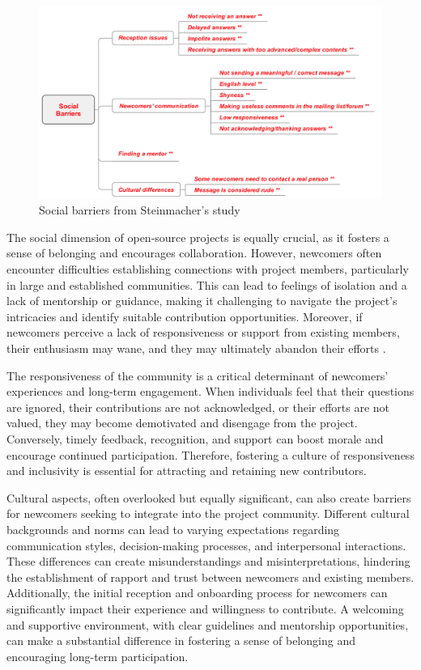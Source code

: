\begin{figure}[ht]
    \centering
    \includegraphics[width=1\linewidth]{figs/socialbarrier.png}
    \caption{Social barriers from Steinmacher's study \citep{03steinmacher2019overcoming}}
    \label{fig:socialbarrier}
\end{figure}

The social dimension of open-source projects is equally crucial, as it fosters a sense of belonging and encourages collaboration. However, newcomers often encounter difficulties establishing connections with project members, particularly in large and established communities. This can lead to feelings of isolation and a lack of mentorship or guidance, making it challenging to navigate the project's intricacies and identify suitable contribution opportunities. Moreover, if newcomers perceive a lack of responsiveness or support from existing members, their enthusiasm may wane, and they may ultimately abandon their efforts \citep{01steinmacher2015systematic,02steinmacher2015social,03steinmacher2019overcoming,04guizani2021long,14hannebauer2017relationship}.

The responsiveness of the community is a critical determinant of newcomers' experiences and long-term engagement. When individuals feel that their questions are ignored, their contributions are not acknowledged, or their efforts are not valued, they may become demotivated and disengage from the project. Conversely, timely feedback, recognition, and support can boost morale and encourage continued participation. Therefore, fostering a culture of responsiveness and inclusivity is essential for attracting and retaining new contributors.

Cultural aspects, often overlooked but equally significant, can also create barriers for newcomers seeking to integrate into the project community. Different cultural backgrounds and norms can lead to varying expectations regarding communication styles, decision-making processes, and interpersonal interactions. These differences can create misunderstandings and misinterpretations, hindering the establishment of rapport and trust between newcomers and existing members. Additionally, the initial reception and onboarding process for newcomers can significantly impact their experience and willingness to contribute. A welcoming and supportive environment, with clear guidelines and mentorship opportunities, can make a substantial difference in fostering a sense of belonging and encouraging long-term participation.


